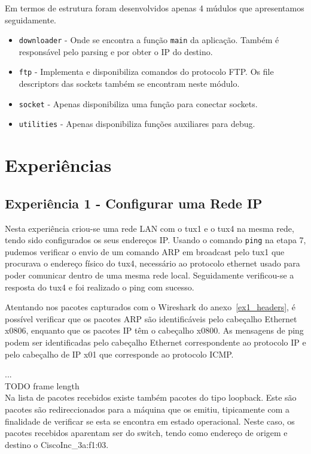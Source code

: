 \documentclass[11pt,a4paper,reqno]{report}
\numberwithin{equation}{section}
\begin{document}
Em termos de estrutura foram desenvolvidos apenas 4 múdulos que apresentamos seguidamente.
\begin{itemize} 
\item \verb|downloader| - Onde se encontra a função \verb|main| da aplicação. Também é responsável pelo parsing e por obter o IP do destino.
\item \verb|ftp| -  Implementa e disponibiliza comandos do protocolo FTP. Os file descriptors das sockets também se encontram neste módulo.
\item \verb|socket| - Apenas disponibiliza uma função para conectar sockets.
\item \verb|utilities| - Apenas disponibiliza funções auxiliares para debug.
\end{itemize}

\chapter{Experiências}

\section{Experiência 1 - Configurar uma Rede IP}

Nesta experiência criou-se uma rede LAN com o tux1 e o tux4 na mesma rede, tendo sido configurados os seus endereços IP. Usando o comando \verb|ping| na etapa 7, pudemos verificar o envio de um comando ARP em broadcast pelo tux1 que procurava o endereço físico do tux4, necessário ao protocolo ethernet usado para poder comunicar dentro de uma mesma rede local. Seguidamente verificou-se a resposta do tux4 e foi realizado o ping com sucesso.

Atentando nos pacotes capturados com o Wireshark do anexo~\ref{ex1_headers}, é possível verificar que os pacotes ARP são identificáveis pelo cabeçalho Ethernet x0806, enquanto que os pacotes IP têm o cabeçalho x0800. As mensagens de ping podem ser identificadas pelo cabeçalho Ethernet correspondente ao protocolo IP e pelo cabeçalho de IP x01 que corresponde ao protocolo ICMP.

...\\ TODO frame length \\

Na lista de pacotes recebidos existe também pacotes do tipo loopback. Este são pacotes são redireccionados para a máquina que os emitiu, tipicamente com a finalidade de verificar se esta se encontra em estado operacional. Neste caso, os pacotes recebidos aparentam ser do switch, tendo como endereço de origem e destino o CiscoInc\_3a:f1:03.
\end{document}
